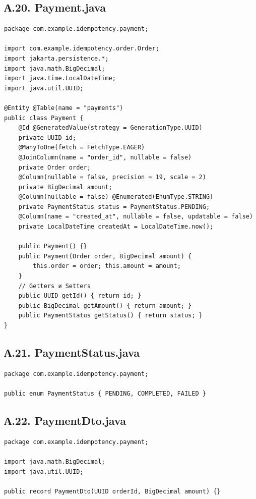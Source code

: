 \subsection*{А.20. Payment.java}
\begin{lstlisting}[caption={Payment.java --- сущность платежа}]
package com.example.idempotency.payment;

import com.example.idempotency.order.Order;
import jakarta.persistence.*;
import java.math.BigDecimal;
import java.time.LocalDateTime;
import java.util.UUID;

@Entity @Table(name = "payments")
public class Payment {
    @Id @GeneratedValue(strategy = GenerationType.UUID)
    private UUID id;
    @ManyToOne(fetch = FetchType.EAGER)
    @JoinColumn(name = "order_id", nullable = false)
    private Order order;
    @Column(nullable = false, precision = 19, scale = 2)
    private BigDecimal amount;
    @Column(nullable = false) @Enumerated(EnumType.STRING)
    private PaymentStatus status = PaymentStatus.PENDING;
    @Column(name = "created_at", nullable = false, updatable = false)
    private LocalDateTime createdAt = LocalDateTime.now();

    public Payment() {}
    public Payment(Order order, BigDecimal amount) {
        this.order = order; this.amount = amount;
    }
    // Getters и Setters
    public UUID getId() { return id; }
    public BigDecimal getAmount() { return amount; }
    public PaymentStatus getStatus() { return status; }
}
\end{lstlisting}

\subsection*{А.21. PaymentStatus.java}
\begin{lstlisting}[caption={PaymentStatus.java}]
package com.example.idempotency.payment;

public enum PaymentStatus { PENDING, COMPLETED, FAILED }
\end{lstlisting}

\subsection*{А.22. PaymentDto.java}
\begin{lstlisting}[caption={PaymentDto.java}]
package com.example.idempotency.payment;

import java.math.BigDecimal;
import java.util.UUID;

public record PaymentDto(UUID orderId, BigDecimal amount) {}
\end{lstlisting}

